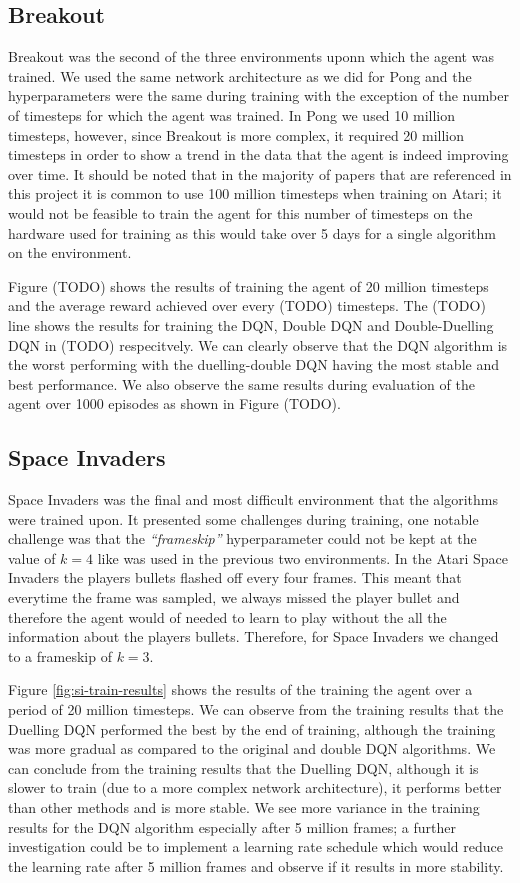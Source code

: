 \subsection{Breakout}
Breakout was the second of the three environments uponn which the agent was trained. We used the same network architecture as we did for Pong and the hyperparameters were the same during training with the exception of the number of timesteps for which the agent was trained. In Pong we used 10 million timesteps, however, since Breakout is more complex, it required 20 million timesteps in order to show a trend in the data that the agent is indeed improving over time. It should be noted that in the majority of papers that are referenced in this project it is common to use 100 million timesteps when training on Atari; it would not be feasible to train the agent for this number of timesteps on the hardware used for training as this would take over 5 days for a single algorithm on the environment.

Figure (TODO) shows the results of training the agent of 20 million timesteps and the average reward achieved over every (TODO) timesteps. The (TODO) line shows the results for training the DQN, Double DQN and Double-Duelling DQN in (TODO) respecitvely. We can clearly observe that the DQN algorithm is the worst performing with the duelling-double DQN having the most stable and best performance. We also observe the same results during evaluation of the agent over 1000 episodes as shown in Figure (TODO).

\subsection{Space Invaders}
Space Invaders was the final and most difficult environment that the algorithms were trained upon. It presented some challenges during training, one notable challenge was that the \textit{``frameskip''} hyperparameter could not be kept at the value of $k = 4$ like was used in the previous two environments. In the Atari Space Invaders the players bullets flashed off every four frames. This meant that everytime the frame was sampled, we always missed the player bullet and therefore the agent would of needed to learn to play without the all the information about the players bullets. Therefore, for Space Invaders we changed to a frameskip of $k = 3$.

Figure \ref{fig:si-train-results} shows the results of the training the agent over a period of 20 million timesteps. We can observe from the training results that the Duelling DQN performed the best by the end of training, although the training was more gradual as compared to the original and double DQN algorithms. We can conclude from the training results that the Duelling DQN, although it is slower to train (due to a more complex network architecture), it performs better than other methods and is more stable. We see more variance in the training results for the DQN algorithm especially after 5 million frames; a further investigation could be to implement a learning rate schedule which would reduce the learning rate after 5 million frames and observe if it results in more stability.

